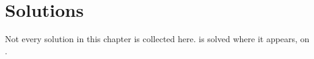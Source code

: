 \section{Solutions}
\label{sec:jordan_measure_solutions}

Not every solution in this chapter is collected here.  is
solved where it appears, on .

